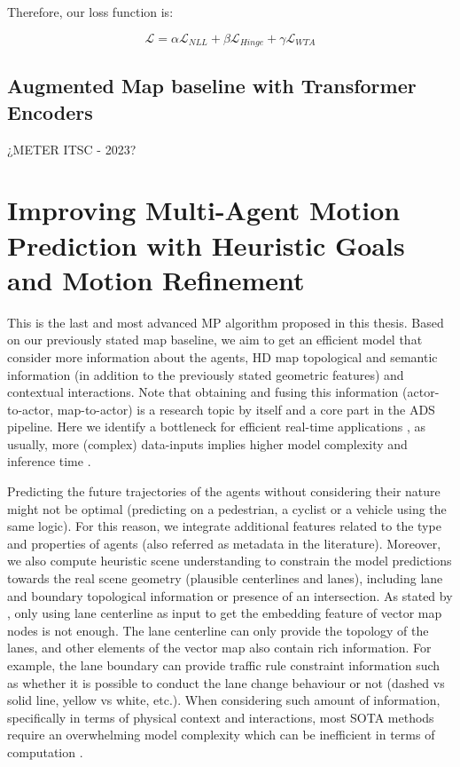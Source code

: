 Therefore, our loss function is:

\begin{equation}
	\mathcal{L} = \alpha \mathcal{L}_{NLL} + \beta \mathcal{L}_{Hinge} + \gamma \mathcal{L}_{WTA}
	\label{eq:loss}
\end{equation}

\subsection{Augmented Map baseline with Transformer Encoders}
\label{sec:4_augmented_map_baseline}

¿METER ITSC - 2023?

\section{Improving Multi-Agent Motion Prediction with Heuristic Goals and Motion Refinement}
\label{sec:4_improving_efficiency}

This is the last and most advanced \ac{MP} algorithm proposed in this thesis. Based on our previously stated map baseline, we aim to get an efficient model that consider more information about the agents, HD map topological and semantic information (in addition to the previously stated geometric features) and contextual interactions. Note that obtaining and fusing this information (\eg actor-to-actor, map-to-actor) is a research topic by itself \cite{varadarajan2022multipath++, zeng2021lanercnn, liang2020learning} and a core part in the \ac{ADS} pipeline. Here we identify a bottleneck for efficient real-time applications \cite{KATRAKAZAS2015416realtime, gomez2021smartmot}, as usually, more (complex) data-inputs implies higher model complexity and inference time \cite{gao2020vectornet}. 

Predicting the future trajectories of the agents without considering their nature might not be optimal (\eg predicting on a pedestrian, a cyclist or a vehicle using the same logic). For this reason, we integrate additional features related to the type and properties of agents (also referred as metadata in the literature). Moreover, we also compute heuristic scene understanding to constrain the model predictions towards the real scene geometry (\eg plausible centerlines and lanes), including lane and boundary topological information or presence of an intersection. 
As stated by \cite{zhang2022banet}, only using lane centerline as input to get the embedding feature of vector map nodes is not enough. The lane centerline can only provide the
topology of the lanes, and other elements of the vector map also contain rich information. For example, the lane boundary can provide traffic rule constraint information such as whether it is possible to conduct the lane change behaviour or not (dashed vs solid line, yellow vs white, etc.). When considering such amount of information, specifically in terms of physical context and interactions, most \ac{SOTA} methods require an overwhelming model complexity which can be inefficient in terms of computation \cite{gao2020vectornet, walters2020trajectory, can2022maps}.

